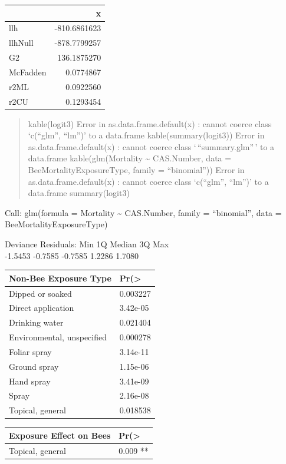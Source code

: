 \documentclass[
  12pt,
]{article}
\begin{document}
\begin{longtable}[]{@{}lr@{}}
\toprule
& x \\
\midrule
\endhead
llh & -810.6861623 \\
llhNull & -878.7799257 \\
G2 & 136.1875270 \\
McFadden & 0.0774867 \\
r2ML & 0.0922560 \\
r2CU & 0.1293454 \\
\bottomrule
\end{longtable}

\begin{quote}
kable(logit3) Error in as.data.frame.default(x) : cannot coerce class
`c(``glm'', ``lm'')' to a data.frame kable(summary(logit3)) Error in
as.data.frame.default(x) : cannot coerce class `\,``summary.glm''\,' to
a data.frame kable(glm(Mortality \textasciitilde{} CAS.Number, data =
BeeMortalityExposureType, family = ``binomial'')) Error in
as.data.frame.default(x) : cannot coerce class `c(``glm'', ``lm'')' to a
data.frame summary(logit3)
\end{quote}

Call: glm(formula = Mortality \textasciitilde{} CAS.Number, family =
``binomial'', data = BeeMortalityExposureType)

Deviance Residuals: Min 1Q Median 3Q Max\\
-1.5453 -0.7585 -0.7585 1.2286 1.7080

\begin{longtable}[]{@{}ll@{}}
\toprule
Non-Bee Exposure Type & Pr(\textgreater{} \\
\midrule
\endhead
Dipped or soaked & 0.003227 \\
Direct application & 3.42e-05 \\
Drinking water & 0.021404 \\
Environmental, unspecified & 0.000278 \\
Foliar spray & 3.14e-11 \\
Ground spray & 1.15e-06 \\
Hand spray & 3.41e-09 \\
Spray & 2.16e-08 \\
Topical, general & 0.018538 \\
\bottomrule
\end{longtable}

\begin{longtable}[]{@{}ll@{}}
\toprule
Exposure Effect on Bees & Pr(\textgreater{} \\
\midrule
\endhead
Topical, general & 0.009 ** \\
\bottomrule
\end{longtable}
\end{document}
